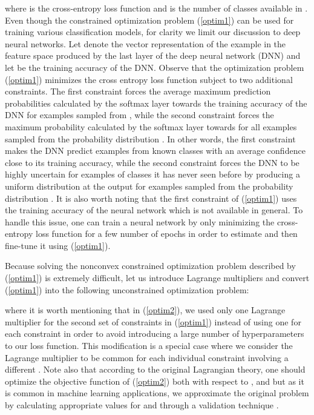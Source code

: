 \documentclass{article} \usepackage{iclr2020_conference,times}
\begin{document}
where  is the cross-entropy loss function and  is the number of classes available in . Even though the constrained optimization problem (\ref{optim1}) can be used for training various classification models, for clarity we limit our discussion to deep neural networks. Let  denote the vector representation of the example  in the feature space produced by the last layer of the deep neural network (DNN) and let  be the training accuracy of the DNN. Observe that the optimization problem (\ref{optim1}) minimizes the cross entropy loss function subject to two additional constraints. The first constraint forces the average maximum prediction probabilities calculated by the softmax layer towards the training accuracy of the DNN for examples sampled from , while the second constraint forces the maximum probability calculated by the softmax layer towards  for all examples sampled from the probability distribution . In other words, the first constraint makes the DNN predict examples from known classes with an average confidence close to its training accuracy, while the second constraint forces the DNN to be highly uncertain for examples of classes it has never seen before by producing a uniform distribution at the output for examples sampled from the probability distribution . It is also worth noting that the first constraint of (\ref{optim1}) uses the training accuracy of the neural network  which is not available in general. To handle this issue, one can train a neural network by only minimizing the cross-entropy loss function for a few number of epochs in order to estimate  and then fine-tune it using (\ref{optim1}). 

\par Because solving the nonconvex constrained optimization problem described by (\ref{optim1}) is extremely difficult, let us introduce Lagrange multipliers \citep{citeulike:163662} and convert (\ref{optim1}) into the following unconstrained optimization problem:

where it is worth mentioning that in (\ref{optim2}), we used only one Lagrange multiplier for the second set of constraints in (\ref{optim1}) instead of using one for each constraint in order to avoid introducing a large number of hyperparameters to our loss function. This modification is a special case where we consider the Lagrange multiplier  to be common for each individual constraint involving a different . Note also that according to the original Lagrangian theory, one should optimize the objective function of (\ref{optim2}) both with respect to ,  and  but as it is common in machine learning applications, we approximate the original problem by calculating appropriate values for  and  through a validation technique \citep{hastie01statisticallearning}.  
\end{document}
